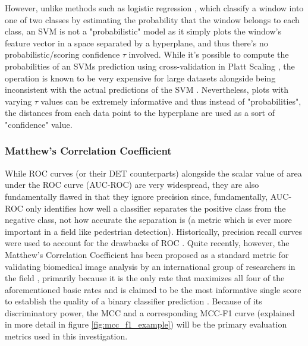 However, unlike methods such as logistic regression \cite{cornell_log_regression_notes}, which classify a window into one of two classes by estimating the probability that the window belongs to each class, an SVM is not a "probabilistic" model as it simply plots the window's feature vector in a space separated by a hyperplane, and thus there's no probabilistic/scoring confidence $\tau$ involved. While it's possible to compute the probabilities of an SVMs prediction using cross-validation in Platt Scaling \cite{platt1999probabilistic}, the operation is known to be very expensive for large datasets \cite{scikit-learn_svm} alongside being inconsistent with the actual predictions of the SVM \cite{scikit-learn_svm}. Nevertheless, plots with varying $\tau$ values can be extremely informative \cite{martin1997det} \cite{scikit-learn_svm} and thus instead of "probabilities", the distances from each data point to the hyperplane are used as a sort of "confidence" value.

\subsubsection{Matthew's Correlation Coefficient}

While ROC curves (or their DET counterparts) alongside the scalar value of area under the ROC curve (AUC-ROC) are very widespread, they are also fundamentally flawed in that they ignore precision since, fundamentally, AUC-ROC only identifies how well a classifier separates the positive class from the negative class, not how accurate the separation is (a metric which is ever more important in a field like pedestrian detection). Historically, precision recall curves were used to account for the drawbacks of ROC \cite{chicco_jurman_2020_mcc_f1}. Quite recently, however, the Matthew's Correlation Coefficient has been proposed as a standard metric for validating biomedical image analysis by an international group of researchers in the field \cite{Maier_Hein_2024_mcc_proposal}, primarily because it is the only rate that maximizes all four of the aforementioned basic rates \cite{Maier_Hein_2024_mcc_proposal} \cite{chicco_eval_2023} \cite{chicco_jurman_2020_mcc_f1} and is claimed to be the most informative single score to establish the quality of a binary classifier prediction \cite{chicco_eval_2023}. Because of its discriminatory power, the MCC and a corresponding MCC-F1 curve (explained in more detail in figure \ref{fig:mcc_f1_example}) will be the primary evaluation metrics used in this investigation. 

